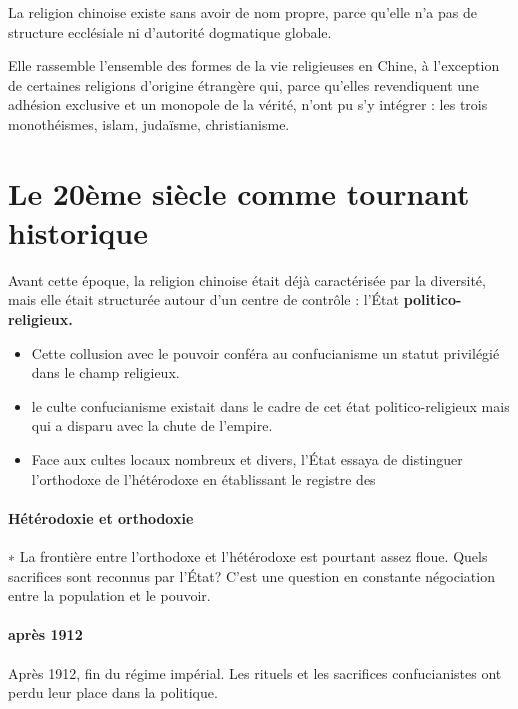 \begin{Prop}






La religion chinoise existe sans avoir de nom propre, parce qu’elle n’a pas de structure ecclésiale ni d’autorité dogmatique globale.


\end{Prop}

Elle rassemble l’ensemble des formes de la vie religieuses en Chine, à l’exception de certaines religions d’origine étrangère qui, parce qu’elles revendiquent une adhésion exclusive et un monopole de la vérité, n’ont pu s’y intégrer : les trois monothéismes, islam, judaïsme, christianisme. 

\section{Le 20ème siècle comme tournant historique}
 

Avant cette époque, la religion chinoise était déjà caractérisée par la diversité, mais elle était structurée autour d’un centre de contrôle : l’État \textbf{politico-religieux.}
\begin{itemize}

    \item  	Cette collusion avec le pouvoir conféra au confucianisme un statut privilégié dans le champ religieux.
    \item le culte confucianisme existait dans le cadre de cet état politico-religieux mais qui a disparu avec la chute de l'empire.
    \item	Face aux cultes locaux nombreux et divers, l’État essaya de distinguer l’orthodoxe de l’hétérodoxe en établissant le registre des  

  \end{itemize}

\paragraph{Hétérodoxie et orthodoxie} ∗ La frontière entre l’orthodoxe et l’hétérodoxe est pourtant assez floue. Quels sacrifices sont reconnus par l’État? C’est une question en constante négociation entre la population et le pouvoir.

\paragraph{après 1912}Après 1912, fin du régime impérial.
Les rituels et les sacrifices confucianistes ont perdu leur place dans la politique.

